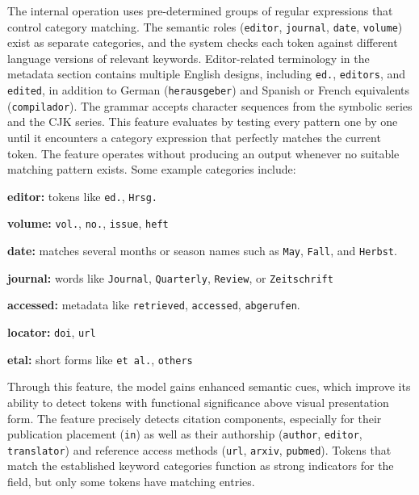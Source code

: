 The internal operation uses pre-determined groups of regular expressions that control category matching. The semantic roles (\texttt{editor}, \texttt{journal}, \texttt{date}, \texttt{volume}) exist as separate categories, and the system checks each token against different language versions of relevant keywords. Editor-related terminology in the metadata section contains multiple English designs, including \texttt{ed.}, \texttt{editors}, and \texttt{edited}, in addition to German (\texttt{herausgeber}) and Spanish or French equivalents (\texttt{compilador}). The grammar accepts character sequences from the symbolic series and the CJK series.
This feature evaluates by testing every pattern one by one until it encounters a category expression that perfectly matches the current token. The feature operates without producing an output whenever no suitable matching pattern exists.
Some example categories include:
\begin{compactitem}
\item \textbf{editor:} tokens like \texttt{ed.}, \texttt{Hrsg.}
\item \textbf{volume:} \texttt{vol.}, \texttt{no.}, \texttt{issue}, \texttt{heft}
\item \textbf{date:} matches several months or season names such as \texttt{May}, \texttt{Fall}, and \texttt{Herbst}.
\item \textbf{journal:} words like \texttt{Journal}, \texttt{Quarterly}, \texttt{Review}, or \texttt{Zeitschrift}
\item \textbf{accessed:} metadata like \texttt{retrieved}, \texttt{accessed}, \texttt{abgerufen}.
\item \textbf{locator:} \texttt{doi}, \texttt{url}
\item \textbf{etal:} short forms like \texttt{et al.}, \texttt{others}
\end{compactitem}
Through this feature, the model gains enhanced semantic cues, which improve its ability to detect tokens with functional significance above visual presentation form. The feature precisely detects citation components, especially for their publication placement (\texttt{in}) as well as their authorship (\texttt{author}, \texttt{editor}, \texttt{translator}) and reference access methods (\texttt{url}, \texttt{arxiv}, \texttt{pubmed}).
Tokens that match the established keyword categories function as strong indicators for the field, but only some tokens have matching entries.

